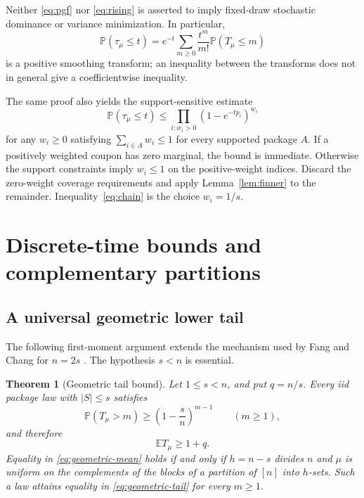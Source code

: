 \documentclass[11pt]{article}
\numberwithin{equation}{section}
\newtheorem{theorem}{Theorem}[section]
\theoremstyle{remark}
\newcommand{\Pp}{\mathbb P}
\newcommand{\E}{\mathbb E}
\newcommand{\1}{\mathbf 1}
\begin{document}
Neither \eqref{eq:pgf} nor \eqref{eq:rising} is asserted to imply fixed-draw stochastic dominance or variance minimization. In particular,
\[
 \Pp(\tau_\mu\leq t)
 =e^{-t}\sum_{m\geq0}\frac{t^m}{m!}\Pp(T_\mu\leq m)
\]
is a positive smoothing transform; an inequality between the transforms does not in general give a coefficientwise inequality.

The same proof also yields the support-sensitive estimate
\begin{equation}\label{eq:weighted}
 \Pp(\tau_\mu\leq t)
 \leq\prod_{i:w_i>0}(1-e^{-tp_i})^{w_i}
\end{equation}
for any $w_i\geq0$ satisfying $\sum_{i\in A}w_i\leq1$ for every supported package $A$. If a positively weighted coupon has zero marginal, the bound is immediate. Otherwise the support constraints imply $w_i\leq1$ on the positive-weight indices. Discard the zero-weight coverage requirements and apply Lemma~\ref{lem:finner} to the remainder. Inequality~\eqref{eq:chain} is the choice $w_i=1/s$.

\section{Discrete-time bounds and complementary partitions}\label{sec:discrete}

\subsection{A universal geometric lower tail}

The following first-moment argument extends the mechanism used by Fang and Chang for $n=2s$ \cite[Lemma~1 and Theorem~2]{FangChang}. The hypothesis $s<n$ is essential.

\begin{theorem}[Geometric tail bound]\label{thm:geometric}
Let $1\leq s<n$, and put $q=n/s$. Every iid package law with $|S|\leq s$ satisfies
\begin{equation}\label{eq:geometric-tail}
 \Pp(T_\mu>m)\geq \left(1-\frac sn\right)^{m-1}
 \qquad(m\geq1),
\end{equation}
and therefore
\begin{equation}\label{eq:geometric-mean}
 \E T_\mu\geq 1+q.
\end{equation}
Equality in \eqref{eq:geometric-mean} holds if and only if $h=n-s$ divides $n$ and $\mu$ is uniform on the complements of the blocks of a partition of $[n]$ into $h$-sets. Such a law attains equality in \eqref{eq:geometric-tail} for every $m\geq1$.
\end{theorem}
\end{document}
